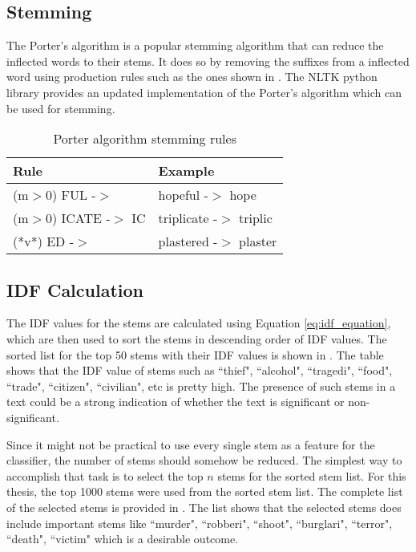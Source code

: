 \subsection{Stemming}
The Porter's algorithm\cite{porter1980algorithm} is a popular stemming algorithm that can reduce the inflected words to their stems. It does so by removing the suffixes from a inflected word using production rules such as the ones shown in . The NLTK python library provides an updated implementation of the Porter's algorithm which can be used for stemming.

\begin{table}
    \centering
    \caption{Porter algorithm stemming rules}
    \label{tbl:porter_algo}
    \begin{tabular}{p{4cm}p{4cm}}
    \toprule
    Rule&Example \\
    \midrule
    (m$>$0) FUL -$>$  &  hopeful -$>$ hope \\
    (m$>$0) ICATE -$>$ IC  & triplicate -$>$ triplic \\
    (*v*) ED -$>$ & plastered -$>$ plaster \\
    \bottomrule
    \end{tabular}
\end{table}

\subsection{IDF Calculation}
The IDF values for the stems are calculated using Equation \eqref{eq:idf_equation}, which are then used to sort the stems in descending order of IDF values. The sorted list for the top 50 stems with their IDF values is shown in . The table shows that the IDF value of stems such as ``thief", ``alcohol", ``tragedi", ``food", ``trade", ``citizen", ``civilian", etc is pretty high. The presence of such stems in a text could be a strong indication of whether the text is significant or non-significant.

Since it might not be practical to use every single stem as a feature for the classifier, the number of stems should somehow be reduced. The simplest way to accomplish that task is to select the top $n$ stems for the sorted stem list. For this thesis, the top 1000 stems were used from the sorted stem list. The complete list of the selected stems is provided in . The list shows that the selected stems does include important stems like ``murder", ``robberi", ``shoot", ``burglari", ``terror", ``death", ``victim" which is a desirable outcome.


